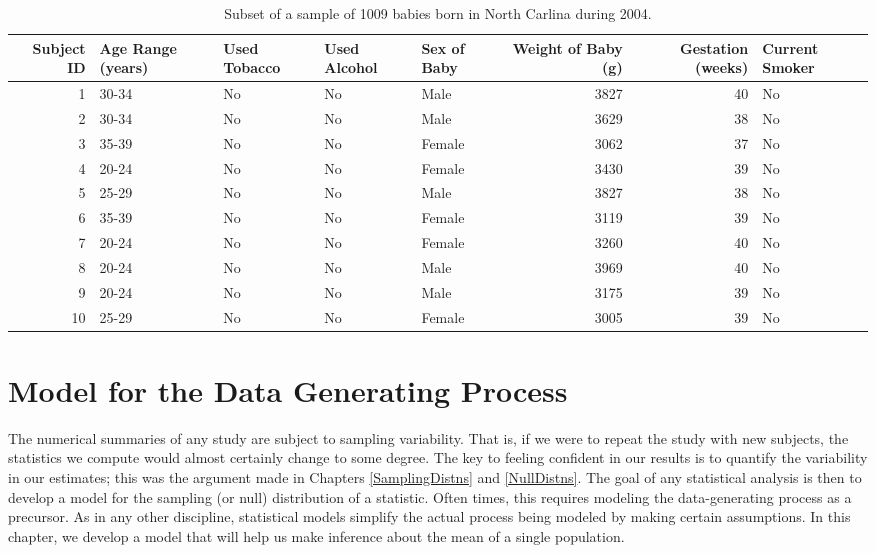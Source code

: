 \documentclass[]{book}
\theoremstyle{plain}
\theoremstyle{mydefn}
\theoremstyle{myexmpl}
\theoremstyle{remark}
\begin{document}
\begin{table}

\caption{\label{tab:casebabies-table}Subset of a sample of 1009 babies born in North Carlina during 2004.}
\centering
\begin{tabular}[t]{r|l|l|l|l|r|r|l}
\hline
Subject ID & Age Range (years) & Used Tobacco & Used Alcohol & Sex of Baby & Weight of Baby (g) & Gestation (weeks) & Current Smoker\\
\hline
1 & 30-34 & No & No & Male & 3827 & 40 & No\\
\hline
2 & 30-34 & No & No & Male & 3629 & 38 & No\\
\hline
3 & 35-39 & No & No & Female & 3062 & 37 & No\\
\hline
4 & 20-24 & No & No & Female & 3430 & 39 & No\\
\hline
5 & 25-29 & No & No & Male & 3827 & 38 & No\\
\hline
6 & 35-39 & No & No & Female & 3119 & 39 & No\\
\hline
7 & 20-24 & No & No & Female & 3260 & 40 & No\\
\hline
8 & 20-24 & No & No & Male & 3969 & 40 & No\\
\hline
9 & 20-24 & No & No & Male & 3175 & 39 & No\\
\hline
10 & 25-29 & No & No & Female & 3005 & 39 & No\\
\hline
\end{tabular}
\end{table}

\chapter{Model for the Data Generating Process}\label{MeanModels}

The numerical summaries of any study are subject to sampling
variability. That is, if we were to repeat the study with new subjects,
the statistics we compute would almost certainly change to some degree.
The key to feeling confident in our results is to quantify the
variability in our estimates; this was the argument made in Chapters
\ref{SamplingDistns} and \ref{NullDistns}. The goal of any statistical
analysis is then to develop a model for the sampling (or null)
distribution of a statistic. Often times, this requires modeling the
data-generating process as a precursor. As in any other discipline,
statistical models simplify the actual process being modeled by making
certain assumptions. In this chapter, we develop a model that will help
us make inference about the mean of a single population.
\end{document}
